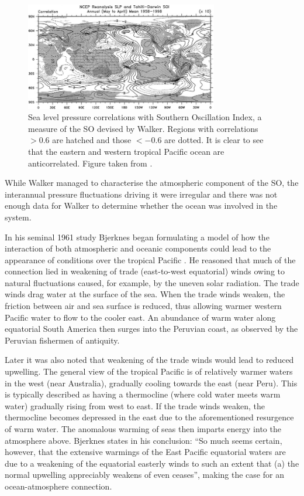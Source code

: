 \begin{figure}
  \centering
  \includegraphics[width=0.75\textwidth]{figures/slp_corr}
  \caption{Sea level pressure correlations with Southern Oscillation Index, a
    measure of the SO devised by Walker. Regions with correlations $>0.6$ are
    hatched and those $<-0.6$ are dotted. It is clear to see that the eastern
    and western tropical Pacific ocean are anticorrelated. Figure taken from
    \cite{trenberth2000}.
  }
  \label{fig:slp_corr}
\end{figure}

While Walker managed to characterise the atmospheric component of the SO, the
interannual pressure fluctuations driving it were irregular and there was not
enough data for Walker to determine whether the ocean was involved in the
system.

\vspace{0.5cm}

In his seminal 1961 study Bjerknes began formulating a model of how the
interaction of both atmospheric and oceanic components could lead to the
appearance of \elnino{} conditions over the tropical Pacific
\citep{bjerknes1961}. He reasoned that much of the connection lied in weakening
of trade (east-to-west equatorial) winds owing to natural fluctuations caused,
for example, by the uneven solar radiation. The trade winds drag water at the
surface of the sea. When the trade winds weaken, the friction between air and
sea surface is reduced, thus allowing warmer western Pacific water to flow to
the cooler east. An abundance of warm water along equatorial South America then
surges into the Peruvian coast, as observed by the Peruvian fishermen of
antiquity.

Later \citep{bjerknes1966} it was also noted that weakening of the trade winds
would lead to reduced upwelling. The general view of the tropical Pacific is of
relatively warmer waters in the west (near Australia), gradually cooling towards
the east (near Peru). This is typically described as having a thermocline (where
cold water meets warm water) gradually rising from west to east. If the trade
winds weaken, the thermocline becomes depressed in the east due to the
aforementioned resurgence of warm water. The anomalous warming of seas then
imparts energy into the atmosphere above. Bjerknes states in his conclusion:
``So much seems certain, however, that the extensive warmings of the East
Pacific equatorial waters are due to a weakening of the equatorial easterly
winds to such an extent that (a) the normal upwelling appreciably weakens of
even ceases'', making the case for an ocean-atmosphere connection.

